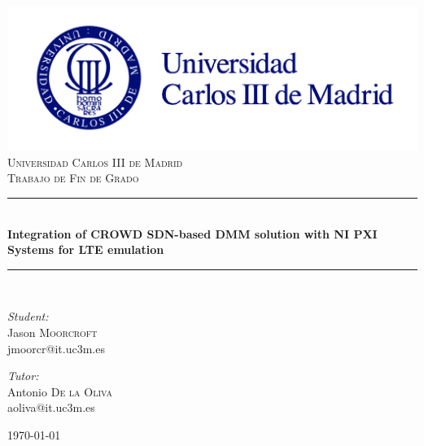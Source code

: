 \newcommand{\HRule}{\rule{\linewidth}{0.5mm}}

\begin{titlingpage}
\begin{center}
 
\vfill
\includegraphics[scale=1.2]{./images/escudo}\\[3em]
\textsc{\LARGE Universidad Carlos III de Madrid}\\[0.5cm]
\textsc{\Large Trabajo de Fin de Grado}\\[0.5cm]

\HRule \\[0.6cm]
\textbf{\Large Integration of CROWD SDN-based DMM solution with NI PXI Systems for LTE emulation}
\HRule \\[0.6cm]
 
\begin{minipage}{0.45\textwidth}
\begin{flushleft} \large
\emph{Student:}\\
Jason \textsc{Moorcroft}\\ jmoorcr@it.uc3m.es
\end{flushleft}
\end{minipage}
\begin{minipage}{0.45\textwidth}
\begin{flushright} \large
\emph{Tutor:} \\
Antonio \textsc{De la Oliva}\\
aoliva@it.uc3m.es
\end{flushright}
\end{minipage}
 
\vfill
 
{\large \today}
 
\end{center}

\end{titlingpage}